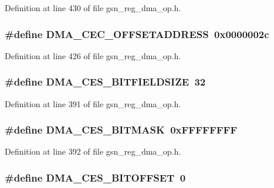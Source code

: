 Definition at line 430 of file gsn\_\-reg\_\-dma\_\-op.h.

\hypertarget{a00547_aa20030582964128876b5c66ee9c73b71}{
\subsubsection[{DMA\_\-CEC\_\-OFFSETADDRESS}]{\setlength{\rightskip}{0pt plus 5cm}\#define DMA\_\-CEC\_\-OFFSETADDRESS~0x0000002c}}
\label{a00547_aa20030582964128876b5c66ee9c73b71}


Definition at line 426 of file gsn\_\-reg\_\-dma\_\-op.h.

\hypertarget{a00547_a23459780394d9e772421e46079e8f950}{
\subsubsection[{DMA\_\-CES\_\-BITFIELDSIZE}]{\setlength{\rightskip}{0pt plus 5cm}\#define DMA\_\-CES\_\-BITFIELDSIZE~32}}
\label{a00547_a23459780394d9e772421e46079e8f950}


Definition at line 391 of file gsn\_\-reg\_\-dma\_\-op.h.

\hypertarget{a00547_a23edb24829fc4301c693453d6d7bcd58}{
\subsubsection[{DMA\_\-CES\_\-BITMASK}]{\setlength{\rightskip}{0pt plus 5cm}\#define DMA\_\-CES\_\-BITMASK~0xFFFFFFFF}}
\label{a00547_a23edb24829fc4301c693453d6d7bcd58}


Definition at line 392 of file gsn\_\-reg\_\-dma\_\-op.h.

\hypertarget{a00547_ae1d36d6341b4d5562b615dff0e250d48}{
\subsubsection[{DMA\_\-CES\_\-BITOFFSET}]{\setlength{\rightskip}{0pt plus 5cm}\#define DMA\_\-CES\_\-BITOFFSET~0}}
\label{a00547_ae1d36d6341b4d5562b615dff0e250d48}


